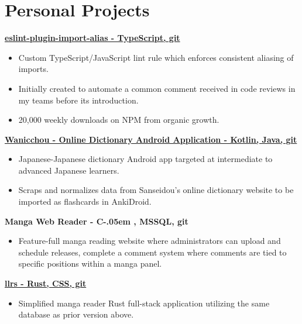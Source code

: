 \documentclass[letterpaper,11pt]{article}
\newcommand{\resumeItem}[2]{
    \vspace{-2pt}
    \item\small{
        \textbf{#1}{ #2 \vspace{-2pt}}
    }
}
\newcommand{\resumeItemListStart}{\begin{itemize}}
\newcommand{\resumeItemListEnd}{\end{itemize}}
\newcommand{\Csharp}{%
  {\settoheight{\dimen0}{C}C\kern-.05em \resizebox{!}{\dimen0}{\raisebox{\depth}{\#}}}}
\begin{document}
\section{\textbf{Personal Projects}}
    \small{\textbf{
        \href {
            https://github.com/Limegrass/eslint-plugin-import-alias
        } {
            eslint-plugin-import-alias - TypeScript, git
        }}}
    \resumeItemListStart
        \resumeItem{}
            {
                Custom TypeScript/JavaScript lint rule which enforces consistent aliasing of imports.
            }
        \resumeItem{}
            {
                Initially created to automate a common comment received in code reviews in my teams before its introduction.
            }
        \resumeItem{}
            {
                20,000 weekly downloads on NPM from organic growth.
            }
    \resumeItemListEnd
    \small{\textbf{
        \href {
            https://github.com/Limegrass/Wanicchou
        } {
            Wanicchou - Online Dictionary Android Application
            - Kotlin, Java, git
        }}}
    \resumeItemListStart
        \resumeItem{}
            {
                Japanese-Japanese dictionary Android app targeted at intermediate to advanced Japanese learners.
            }
        \resumeItem{}
            {
                Scraps and normalizes data from Sanseidou's online dictionary website to be imported as flashcards in AnkiDroid.
            }
    \resumeItemListEnd
    \small{\textbf{
        {
            Manga Web Reader
            - \Csharp, MSSQL, git
        }}}
    \resumeItemListStart
        \resumeItem{}
            {
                Feature-full manga reading website where administrators can upload and schedule releases,
                complete a comment system where comments are tied to specific positions within a manga panel.
            }
    \resumeItemListEnd
    \small{\textbf{
        \href {
            https://github.com/Limegrass/llrs
        } {
            llrs - Rust, CSS, git
        }}}
    \resumeItemListStart
        \resumeItem{}
            {
                Simplified manga reader Rust full-stack application utilizing the same database as prior version above.
            }
    \resumeItemListEnd
\end{document}
